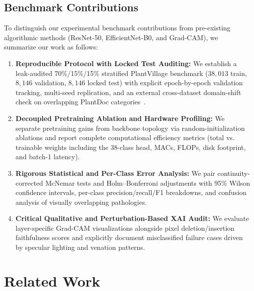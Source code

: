 \documentclass[journal]{IEEEtran}
\begin{document}
\subsection{Benchmark Contributions}
To distinguish our experimental benchmark contributions from pre-existing algorithmic methods (ResNet-50, EfficientNet-B0, and Grad-CAM), we summarize our work as follows:
\begin{enumerate}
    \item \textbf{Reproducible Protocol with Locked Test Auditing:} We establish a leak-audited 70\%/15\%/15\% stratified PlantVillage benchmark ($38,013$ train, $8,146$ validation, $8,146$ locked test) with explicit epoch-by-epoch validation tracking, multi-seed replication, and an external cross-dataset domain-shift check on overlapping PlantDoc categories~\cite{singh2020}.
    \item \textbf{Decoupled Pretraining Ablation and Hardware Profiling:} We separate pretraining gains from backbone topology via random-initialization ablations and report complete computational efficiency metrics (total vs. trainable weights including the 38-class head, MACs, FLOPs, disk footprint, and batch-1 latency).
    \item \textbf{Rigorous Statistical and Per-Class Error Analysis:} We pair continuity-corrected McNemar tests and Holm--Bonferroni adjustments with 95\% Wilson confidence intervals, per-class precision/recall/F1 breakdowns, and confusion analysis of visually overlapping pathologies.
    \item \textbf{Critical Qualitative and Perturbation-Based XAI Audit:} We evaluate layer-specific Grad-CAM visualizations alongside pixel deletion/insertion faithfulness scores and explicitly document misclassified failure cases driven by specular lighting and venation patterns.
\end{enumerate}

\section{Related Work}
\end{document}
